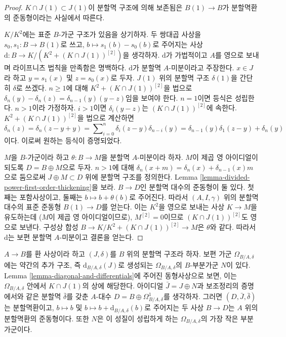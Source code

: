 \begin{proof}
$K \cap J(1) \subset J(1)$이 분할멱 구조에 의해 보존됨은
$B(1) \to B$가 분할멱환의 준동형이라는 사실에서 따른다.

\medskip\noindent
$K/K^2$에는 표준 $B$-가군 구조가 있음을 상기하자.
두 쌍대곱 사상을 $s_0, s_1 : B \to B(1)$로 쓰고,
$b \mapsto s_1(b) - s_0(b)$로 주어지는 사상
$\text{d} : B \to K/(K^2 +(K \cap J(1))^{[2]})$을 생각하자.
$\text{d}$가 가법적이고 $A$를 영으로 보내며 라이프니츠 법칙을
만족함은 명백하다. $\text{d}$가 분할멱 $A$-미분이라고 주장한다.
$x \in J$라 하고 $y = s_1(x)$ 및 $z = s_0(x)$로 두자.
$J(1)$ 위의 분할멱 구조 $\delta(1)$을 간단히 $\delta$로 쓰겠다.
$n \geq 1$에 대해 $K^2 +(K \cap J(1))^{[2]}$을 법으로
$\delta_n(y) - \delta_n(z) = \delta_{n - 1}(y)(y - z)$임을 보여야 한다.
$n = 1$이면 등식은 성립한다. $n > 1$이라 가정하자.
$i > 1$이면 $\delta_i(y - z)$는 $(K \cap J(1))^{[2]}$에 속한다.
$K^2 + (K \cap J(1))^{[2]}$을 법으로 계산하면
$$
\delta_n(z) = \delta_n(z - y + y) =
\sum\nolimits_{i = 0}^n \delta_i(z - y)\delta_{n - i}(y) =
\delta_{n - 1}(y) \delta_1(z - y) + \delta_n(y)
$$
이다. 이로써 원하는 등식이 증명되었다.

\medskip\noindent
$M$을 $B$-가군이라 하고 $\theta : B \to M$을 분할멱
$A$-미분이라 하자. $M$이 제곱 영 아이디얼이 되도록
$D = B \oplus M$으로 두자. $n > 1$에 대해
$\delta_n(x + m) = \delta_n(x) + \delta_{n - 1}(x)m$으로 둠으로써
$J \oplus M \subset D$ 위에 분할멱 구조를 정의한다.
Lemma \ref{lemma-divided-power-first-order-thickening}을 보라.
$B \to D$인 분할멱 대수의 준동형이 둘 있다. 첫째는 포함사상이고,
둘째는 $b \mapsto b + \theta(b)$로 주어진다. 따라서
$(A, I, \gamma)$ 위의 분할멱 대수의 표준 준동형 $B(1) \to D$를 얻는다.
이는 $K^2$을 영으로 보내는 사상 $K \to M$을 유도하는데
($M$이 제곱 영 아이디얼이므로), $M^{[2]} = 0$이므로
$(K \cap J(1))^{[2]}$도 영으로 보낸다. 구성상 합성
$B \to K/K^2 + (K \cap J(1))^{[2]} \to M$은 $\theta$와 같다.
따라서 $\text{d}$는 보편 분할멱 $A$-미분이고 결론을 얻는다.
\end{proof}

\begin{remark}
\label{remark-filtration-differentials}
$A \to B$를 환 사상이라 하고 $(J, \delta)$를 $B$ 위의 분할멱
구조라 하자. 보편 가군 $\Omega_{B/A, \delta}$에는 약간의
추가 구조, 즉 $\text{d}_{B/A, \delta}(J)$로 생성되는
$\Omega_{B/A, \delta}$의 $B$-부분가군 $N$이 있다.
Lemma \ref{lemma-diagonal-and-differentials}에 주어진 동형사상으로 보면,
이는 $\Omega_{B/A, \delta}$ 안에서 $K \cap J(1)$의 상에 해당한다.
아이디얼 $\bar J = J \oplus N$과 보조정리의 증명에서와 같은
분할멱 $\bar \delta$를 갖춘 $A$-대수
$D = B \oplus \Omega^1_{B/A, \delta}$를 생각하자.
그러면 $(D, \bar J, \bar \delta)$는 분할멱환이고,
$b \mapsto b$ 및 $b \mapsto b + \text{d}_{B/A, \delta}(b)$로
주어지는 두 사상 $B \to D$는 $A$ 위의 분할멱환의 준동형이다.
또한 $N$은 이 성질이 성립하게 하는 $\Omega_{B/A, \delta}$의
가장 작은 부분가군이다.
\end{remark}

